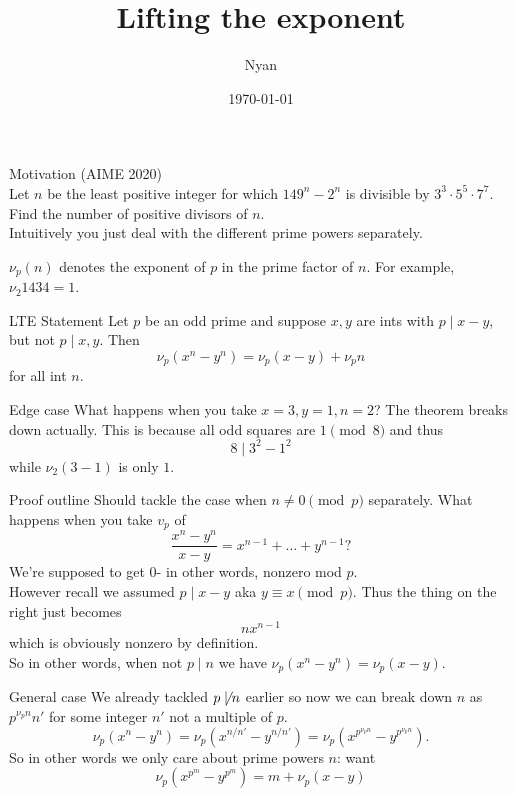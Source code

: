 \documentclass{tropical}
\title{Lifting the exponent}
\author{Nyan}
\date\today
\begin{document}
\begin{frame}{}
\maketitle
\end{frame}
\begin{frame}{Motivation}
(AIME 2020)\\
Let $n$ be the least positive integer for which 
$149^n - 2^n$ is divisible by $3^3 \cdot 5^5 \cdot 7^7$. 
Find the number of positive divisors of $n$.\\
Intuitively you just deal with the different prime powers
separately.
\end{frame}
\begin{frame}
\begin{thm}[Notation]
$\nu_p(n)$ denotes the exponent of $p$ in the prime factor of $n$.
For example, $\nu_2{1434}=1$.
\end{thm}
\begin{block}{LTE Statement}
Let $p$ be an odd prime and suppose $x,y$ are ints with $p\mid x-y$,
but not $p\mid x,y$. Then
\[\nu_p(x^n-y^n)=\nu_p(x-y)+\nu_p n\]
for all int $n$.
\end{block}
\end{frame}
\begin{frame}{Edge case}
What happens when you take $x=3,y=1,n=2$? The theorem breaks down actually.
This is because all odd squares are $1\pmod 8$ and thus
\[8\mid 3^2-1^2\]
while $\nu_2(3-1)$ is only $1$.
\end{frame}
\begin{frame}{Proof outline}
Should tackle the case when $n\neq 0\pmod p$ separately.
What happens when you take $v_p$ of
\[\frac{x^n-y^n}{x-y}=x^{n-1}+\dots+y^{n-1}?\]
We're supposed to get $0$- in other words, nonzero mod $p$.\\
However recall we assumed $p\mid x-y$ aka $y\equiv x \pmod p$.
Thus the thing on the right just becomes 
\[nx^{n-1}\]
which is obviously nonzero by definition.\\
So in other words, when not $p\mid n$ we have $\nu_p(x^n-y^n)=
\nu_p(x-y)$.
\end{frame}
\begin{frame}{General case}
We already tackled $p\not\mid n$ earlier so now we can break down $n$
as $p^{\nu_p n} n'$ for some integer $n'$ not a multiple of $p$.\\
\[\nu_p(x^n-y^n)=\nu_p(x^{n/n'}-y^{n/n'})
=\nu_p(x^{p^{\nu_p n}}-y^{p^{\nu_p n}}).\]
So in other words we only care about prime powers $n$: want 
\[\nu_p(x^{p^m}-y^{p^m})=m+\nu_p(x-y)\]
\end{frame}
\end{document}
